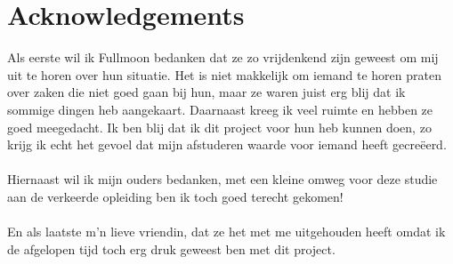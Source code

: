 \chapter*{Acknowledgements} 

Als eerste wil ik Fullmoon bedanken dat ze zo vrijdenkend zijn geweest om mij uit te horen over hun situatie. Het is niet makkelijk om iemand te horen praten over zaken die niet goed gaan bij hun, maar ze waren juist erg blij dat ik sommige dingen heb aangekaart. Daarnaast kreeg ik veel ruimte en hebben ze goed meegedacht. Ik ben blij dat ik dit project voor hun heb kunnen doen, zo krijg ik echt het gevoel dat mijn afstuderen waarde voor iemand heeft gecre\"{e}erd.
\\\\
Hiernaast wil ik mijn ouders bedanken, met een kleine omweg voor deze studie aan de verkeerde opleiding ben ik toch goed terecht gekomen!
\\\\
En als laatste m'n lieve vriendin, dat ze het met me uitgehouden heeft omdat ik de afgelopen tijd toch erg druk geweest ben met dit project.